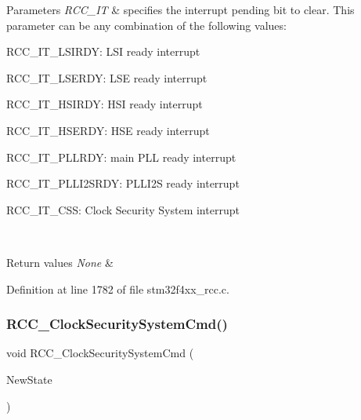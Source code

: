 \begin{DoxyParams}{Parameters}
{\em R\+C\+C\+\_\+\+IT} & specifies the interrupt pending bit to clear. This parameter can be any combination of the following values\+: \begin{DoxyItemize}
\item R\+C\+C\+\_\+\+I\+T\+\_\+\+L\+S\+I\+R\+DY\+: L\+SI ready interrupt \item R\+C\+C\+\_\+\+I\+T\+\_\+\+L\+S\+E\+R\+DY\+: L\+SE ready interrupt \item R\+C\+C\+\_\+\+I\+T\+\_\+\+H\+S\+I\+R\+DY\+: H\+SI ready interrupt \item R\+C\+C\+\_\+\+I\+T\+\_\+\+H\+S\+E\+R\+DY\+: H\+SE ready interrupt \item R\+C\+C\+\_\+\+I\+T\+\_\+\+P\+L\+L\+R\+DY\+: main P\+LL ready interrupt \item R\+C\+C\+\_\+\+I\+T\+\_\+\+P\+L\+L\+I2\+S\+R\+DY\+: P\+L\+L\+I2S ready interrupt \item R\+C\+C\+\_\+\+I\+T\+\_\+\+C\+SS\+: Clock Security System interrupt \end{DoxyItemize}
\\
\hline
\end{DoxyParams}

\begin{DoxyRetVals}{Return values}
{\em None} & \\
\hline
\end{DoxyRetVals}


Definition at line 1782 of file stm32f4xx\+\_\+rcc.\+c.

\mbox{\label{group___r_c_c_ga0ff1fd7b9a8a49cdda11b7d7261c3494}} 
\subsubsection{\texorpdfstring{R\+C\+C\+\_\+\+Clock\+Security\+System\+Cmd()}{RCC\_ClockSecuritySystemCmd()}}
{\footnotesize\ttfamily void R\+C\+C\+\_\+\+Clock\+Security\+System\+Cmd (\begin{DoxyParamCaption}\item[{Functional\+State}]{New\+State }\end{DoxyParamCaption})}



